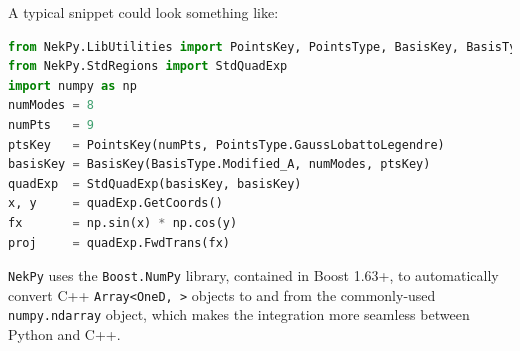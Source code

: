 A typical snippet could look something like:

\begin{lstlisting}[caption={NekPy sample snippet}, label={lst:nekpy_sample}, language=Python]
from NekPy.LibUtilities import PointsKey, PointsType, BasisKey, BasisType
from NekPy.StdRegions import StdQuadExp
import numpy as np
numModes = 8
numPts   = 9
ptsKey   = PointsKey(numPts, PointsType.GaussLobattoLegendre)
basisKey = BasisKey(BasisType.Modified_A, numModes, ptsKey)
quadExp  = StdQuadExp(basisKey, basisKey)
x, y     = quadExp.GetCoords()
fx       = np.sin(x) * np.cos(y)
proj     = quadExp.FwdTrans(fx)
\end{lstlisting}

\texttt{NekPy} uses the \texttt{Boost.NumPy} library, contained in Boost 1.63+, to
automatically convert C++ \texttt{Array<OneD, >} objects to and from the commonly-used
\texttt{numpy.ndarray} object, which makes the integration more seamless between Python
and C++.